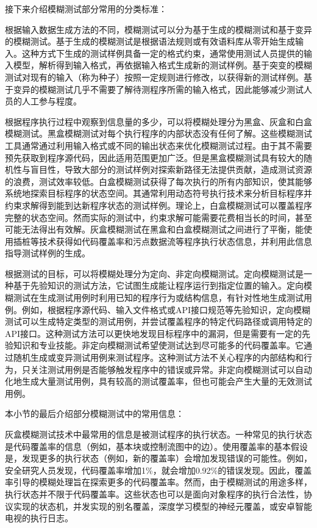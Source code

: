 \documentclass[master]{thesis-uestc}
\begin{document}
接下来介绍模糊测试部分常用的分类标准：

根据输入数据生成方法的不同，模糊测试可以分为基于生成的模糊测试和基于变异的模糊测试。基于生成的模糊测试是根据语法规则或有效语料库从零开始生成输入。这种方式下生成的测试样例具备一定的格式约束，通常使用测试人员提供的输入模型，解析得到输入格式，再依据输入格式生成新的测试样例。基于突变的模糊测试对现有的输入（称为种子）按照一定规则进行修改，以获得新的测试样例。基于变异的模糊测试几乎不需要了解待测程序所需的输入格式，因此能够减少测试人员的人工参与程度。

根据程序执行过程中观察到信息量的多少，可以将模糊处理分为黑盒、灰盒和白盒模糊测试。黑盒模糊测试对每个执行程序的内部状态没有任何了解。这些模糊测试工具通常通过利用输入格式或不同的输出状态来优化模糊测试过程。由于其不需要预先获取到程序源代码，因此适用范围更加广泛。但是黑盒模糊测试具有较大的随机性与盲目性，导致大部分的测试样例对探索新路径无法提供贡献，造成测试资源的浪费，测试效率较低。白盒模糊测试获得了每次执行的所有内部知识，使其能够系统地探索目标程序的状态空间。其通常利用动态符号执行技术来分析目标程序并约束求解得到能到达新程序状态的测试样例。理论上，白盒模糊测试可以覆盖程序完整的状态空间。然而实际的测试中，约束求解可能需要花费相当长的时间，甚至可能无法得出有效解。灰盒模糊测试在黑盒和白盒模糊测试之间进行了平衡，能使用插桩等技术获得如代码覆盖率和污点数据流等程序执行状态信息，并利用此信息指导测试样例的生成。

根据测试的目标，可以将模糊处理分为定向、非定向模糊测试。定向模糊测试是一种基于先验知识的测试方法，它试图生成能让程序运行到指定位置的输入。定向模糊测试在生成测试用例时利用已知的程序行为或结构信息，有针对性地生成测试用例。例如，根据程序源代码、输入文件格式或API接口规范等先验知识，定向模糊测试可以生成特定类型的测试用例，并尝试覆盖程序的特定代码路径或调用特定的API接口。这种测试方法可以更快地发现目标程序中的漏洞，但是需要有一定的先验知识和专业技能。非定向模糊测试希望使测试达到尽可能多的代码覆盖率。它通过随机生成或变异测试用例来测试程序。这种测试方法不关心程序的内部结构和行为，只关注测试用例是否能够触发程序中的错误或异常。非定向模糊测试可以自动化地生成大量测试用例，具有较高的测试覆盖率，但也可能会产生大量的无效测试用例。

本小节的最后介绍部分模糊测试中的常用信息：

灰盒模糊测试技术中最常用的信息是被测试程序的执行状态。一种常见的执行状态是代码覆盖率的信息（例如，基本块或控制流图中的边）。使用覆盖率的基本假设是，发现更多的执行状态（例如，新的覆盖率）会增加发现错误的可能性。例如，安全研究人员发现，代码覆盖率增加1\%，就会增加0.92\%的错误发现。因此，覆盖率引导的模糊处理旨在探索更多的代码覆盖率。然而，由于模糊测试的用途多样，执行状态并不限于代码覆盖率。这些状态也可以是面向对象程序的执行合法性，协议实现的状态机，并发实现的别名覆盖，深度学习模型的神经元覆盖，或安卓智能电视的执行日志。
\end{document}

